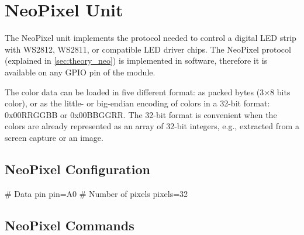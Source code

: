 \section{NeoPixel Unit}

The NeoPixel unit implements the protocol needed to control a digital \gls{LED} strip with WS2812, WS2811, or compatible \gls{LED} driver chips. The NeoPixel protocol (explained in \cref{sec:theory_neo}) is implemented in software, therefore it is available on any \gls{GPIO} pin of the module.

The color data can be loaded in five different format: as packed bytes (3$\times$8 bits color), or as the little- or big-endian encoding of colors in a 32-bit format: 0x00RRGGBB or 0x00BBGGRR. The 32-bit format is convenient when the colors are already represented as an array of 32-bit integers, e.g., extracted from a screen capture or an image.

\subsection{NeoPixel Configuration}

\begin{inicode}
# Data pin
pin=A0
# Number of pixels
pixels=32
\end{inicode}

\subsection{NeoPixel Commands}

